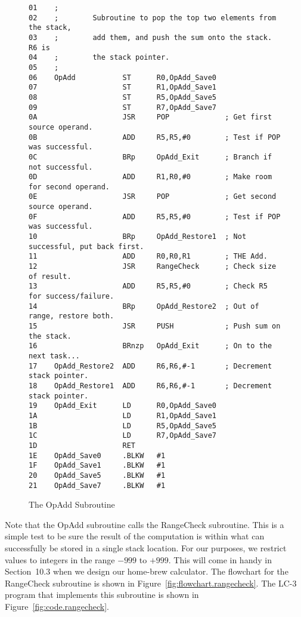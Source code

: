 \documentclass{patt}
\begin{document}
\begin{figure}[h!]
\begin{minipage}{36pc}
\begin{Verbatim}[fontsize=\fontsize{9}{11}\selectfont]
01    ;
02    ;        Subroutine to pop the top two elements from the stack,
03    ;        add them, and push the sum onto the stack.  R6 is
04    ;        the stack pointer.
05    ;
06    OpAdd           ST      R0,OpAdd_Save0
07                    ST      R1,OpAdd_Save1
08                    ST      R5,OpAdd_Save5
09                    ST      R7,OpAdd_Save7
0A                    JSR     POP             ; Get first source operand.
0B                    ADD     R5,R5,#0        ; Test if POP was successful.
0C                    BRp     OpAdd_Exit      ; Branch if not successful.
0D                    ADD     R1,R0,#0        ; Make room for second operand.
0E                    JSR     POP             ; Get second source operand.
0F                    ADD     R5,R5,#0        ; Test if POP was successful.
10                    BRp     OpAdd_Restore1  ; Not successful, put back first.
11                    ADD     R0,R0,R1        ; THE Add.
12                    JSR     RangeCheck      ; Check size of result.
13                    ADD     R5,R5,#0        ; Check R5 for success/failure.
14                    BRp     OpAdd_Restore2  ; Out of range, restore both.
15                    JSR     PUSH            ; Push sum on the stack.
16                    BRnzp   OpAdd_Exit      ; On to the next task...
17    OpAdd_Restore2  ADD     R6,R6,#-1       ; Decrement stack pointer.
18    OpAdd_Restore1  ADD     R6,R6,#-1       ; Decrement stack pointer.
19    OpAdd_Exit      LD      R0,OpAdd_Save0
1A                    LD      R1,OpAdd_Save1
1B                    LD      R5,OpAdd_Save5
1C                    LD      R7,OpAdd_Save7
1D                    RET
1E    OpAdd_Save0     .BLKW   #1
1F    OpAdd_Save1     .BLKW   #1
20    OpAdd_Save5     .BLKW   #1
21    OpAdd_Save7     .BLKW   #1
\end{Verbatim}
\caption{The OpAdd Subroutine}
\label{fig:opadd.algorithm}
\end{minipage}
\end{figure}

\FloatBarrier
Note that the OpAdd subroutine calls the RangeCheck subroutine. This is
a simple test to be sure the result of the computation is within what
can successfully be stored in a single stack location. For our
purposes, we restrict values to integers in the range $-999$
to $+999$.  This will come in handy in Section~10.3 when we design our
home-brew calculator. The flowchart for the RangeCheck subroutine is
shown in Figure~\ref{fig:flowchart.rangecheck}. The LC-3 program that
implements this subroutine is shown in
Figure~\ref{fig:code.rangecheck}.
\end{document}
